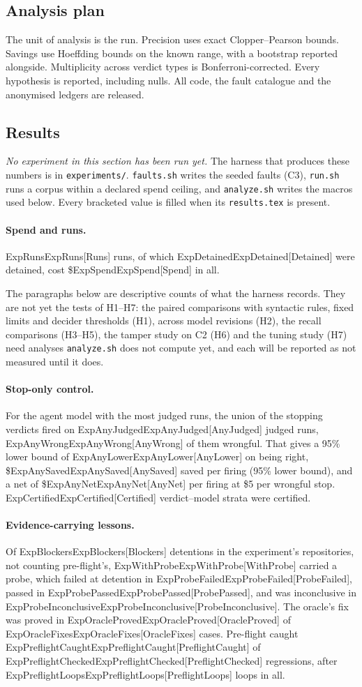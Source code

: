 \documentclass[11pt]{article}
\theoremstyle{remark}
\newcommand{\tbd}[1]{\textcolor{red!70!black}{[#1]}}
\newcommand{\expval}[1]{\ifcsname Exp#1\endcsname\csname Exp#1\endcsname\else\tbd{#1}\fi}
\begin{document}
\subsection{Analysis plan}
The unit of analysis is the run. Precision uses exact Clopper--Pearson bounds. Savings use Hoeffding bounds on the known range, with a bootstrap reported alongside. Multiplicity across verdict types is Bonferroni-corrected. Every hypothesis is reported, including nulls. All code, the fault catalogue and the anonymised ledgers are released.

\subsection{Results}
\emph{No experiment in this section has been run yet.} The harness that produces these numbers is in \texttt{experiments/}. \texttt{faults.sh} writes the seeded faults (C3), \texttt{run.sh} runs a corpus within a declared spend ceiling, and \texttt{analyze.sh} writes the macros used below. Every bracketed value is filled when its \texttt{results.tex} is present.

\paragraph{Spend and runs.} \expval{Runs} runs, of which \expval{Detained} were detained, cost \$\expval{Spend} in all.

The paragraphs below are descriptive counts of what the harness records. They are not yet the tests of H1--H7: the paired comparisons with syntactic rules, fixed limits and decider thresholds (H1), across model revisions (H2), the recall comparisons (H3--H5), the tamper study on C2 (H6) and the tuning study (H7) need analyses \texttt{analyze.sh} does not compute yet, and each will be reported as not measured until it does.

\paragraph{Stop-only control.} For the agent model with the most judged runs, the union of the stopping verdicts fired on \expval{AnyJudged} judged runs, \expval{AnyWrong} of them wrongful. That gives a 95\% lower bound of \expval{AnyLower} on being right, \$\expval{AnySaved} saved per firing (95\% lower bound), and a net of \$\expval{AnyNet} per firing at \$5 per wrongful stop. \expval{Certified} verdict--model strata were certified.

\paragraph{Evidence-carrying lessons.} Of \expval{Blockers} detentions in the experiment's repositories, not counting pre-flight's, \expval{WithProbe} carried a probe, which failed at detention in \expval{ProbeFailed}, passed in \expval{ProbePassed}, and was inconclusive in \expval{ProbeInconclusive}. The oracle's fix was proved in \expval{OracleProved} of \expval{OracleFixes} cases. Pre-flight caught \expval{PreflightCaught} of \expval{PreflightChecked} regressions, after \expval{PreflightLoops} loops in all.
\end{document}
